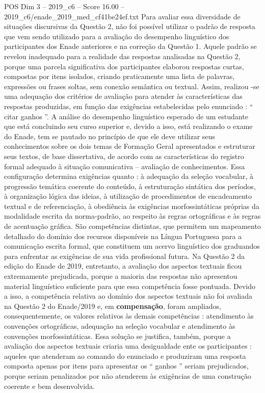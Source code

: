 \begin{textsample}{POS Dim 3 – 2019\_c6 – Score 16.00 – 2019\_c6/enade\_2019\_med\_cf41be24ef.txt}
Para avaliar essa diversidade de situações discursivas da Questão 2, não foi possível utilizar o padrão de resposta que vem sendo utilizado para a avaliação do desempenho linguístico dos participantes dos Enade anteriores e na correção da Questão 1.
Aquele padrão se revelou inadequado para a realidade das respostas analisadas na Questão 2, porque uma parcela significativa dos participantes elaborou respostas curtas, compostas por itens isolados, criando praticamente uma lista de palavras, expressões ou frases soltas, sem conexão semântica ou textual.
Assim, realizou -se uma adequação dos critérios de avaliação para atender às características das respostas produzidas, em função das exigências estabelecidas pelo enunciado : “ citar ganhos ”.
A análise do desempenho linguístico esperado de um estudante que está concluindo seu curso superior e, devido a isso, está realizando o exame do Enade, tem se pautado no princípio de que ele deve utilizar seus conhecimentos sobre os dois temas de Formação Geral apresentados e estruturar seus textos, de base dissertativa, de acordo com as características do registro formal adequado à situação comunicativa – avaliação de conhecimentos.
Essa configuração determina exigências quanto : à adequação da seleção vocabular, à progressão temática coerente do conteúdo, à estruturação sintática dos períodos, à organização lógica das ideias, à utilização de procedimentos de encadeamento textual e de referenciação, à obediência às exigências morfossintáticas próprias da modalidade escrita da norma-padrão, ao respeito às regras ortográficas e às regras de acentuação gráfica.
São competências distintas, que permitem um mapeamento detalhado do domínio dos recursos disponíveis na Língua Portuguesa para a comunicação escrita formal, que constituem um acervo linguístico dos graduandos para enfrentar as exigências de sua vida profissional futura.
Na Questão 2 da edição do Enade de 2019, entretanto, a avaliação dos aspectos textuais ficou extremamente prejudicada, porque a maioria das respostas não apresentou material linguístico suficiente para que essa competência fosse pontuada.
Devido a isso, a competência relativa ao domínio dos aspectos textuais não foi avaliada na Questão 2 do Enade/2019 e, em \textbf{compensação}, foram ampliados, consequentemente, os valores relativos às demais competências : atendimento às convenções ortográficas, adequação na seleção vocabular e atendimento às convenções morfossintáticas.
Essa solução se justifica, também, porque a avaliação dos aspectos textuais criaria uma desigualdade ente os participantes : aqueles que atenderam ao comando do enunciado e produziram uma resposta composta apenas por itens para apresentar os “ ganhos ” seriam prejudicados, porque seriam penalizados por não atenderem às exigências de uma construção coerente e bem desenvolvida.

\end{textsample}
